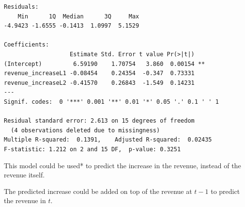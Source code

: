 \documentclass{beamer}\usepackage[]{graphicx}\usepackage[]{color}
\makeatletter
\newenvironment{kframe}{%
 \def\at@end@of@kframe{}%
 \ifinner\ifhmode%
  \def\at@end@of@kframe{\end{minipage}}%
  \begin{minipage}{\columnwidth}%
 \fi\fi%
 \def\FrameCommand##1{\hskip\@totalleftmargin \hskip-\fboxsep
 \colorbox{shadecolor}{##1}\hskip-\fboxsep
     \hskip-\linewidth \hskip-\@totalleftmargin \hskip\columnwidth}%
 \MakeFramed {\advance\hsize-\width
   \@totalleftmargin\z@ \linewidth\hsize
   \@setminipage}}%
 {\par\unskip\endMakeFramed%
 \at@end@of@kframe}
\newenvironment{knitrout}{}{} %
\makeatother
\begin{document}
\begin{darkframes}
\begin{frame}[fragile]
\begin{knitrout}
\begin{kframe}
\begin{verbatim}
Residuals:
    Min      1Q  Median      3Q     Max 
-4.9423 -1.6555 -0.1413  1.0997  5.1529 

Coefficients:
                   Estimate Std. Error t value Pr(>|t|)   
(Intercept)         6.59190    1.70754   3.860  0.00154 **
revenue_increaseL1 -0.08454    0.24354  -0.347  0.73331   
revenue_increaseL2 -0.41570    0.26843  -1.549  0.14231   
---
Signif. codes:  0 '***' 0.001 '**' 0.01 '*' 0.05 '.' 0.1 ' ' 1

Residual standard error: 2.613 on 15 degrees of freedom
  (4 observations deleted due to missingness)
Multiple R-squared:  0.1391,	Adjusted R-squared:  0.02435 
F-statistic: 1.212 on 2 and 15 DF,  p-value: 0.3251
\end{verbatim}
\end{kframe}
\end{knitrout}
     \end{frame}
    
    
    \begin{frame}[fragile]
     \fontsize{9}{9}\selectfont
        This model could be used* to predict the increase in the revenue, instead of the revenue itself.
        \bigskip
        
        The predicted increase could be added on top of the revenue at $t-1$ to predict the revenue in $t$.

     \end{frame}



    
  \end{darkframes}
\end{document}
